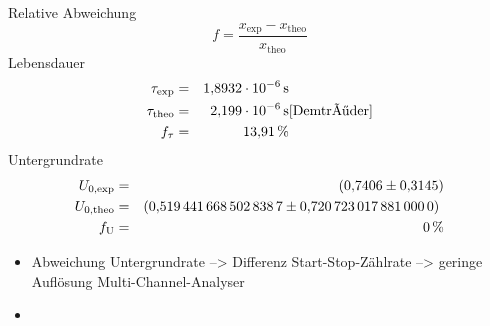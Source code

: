 Relative Abweichung
\begin{equation*}
  f=\frac{x_{\text{exp}}-x_{\text{theo}}}{x_{\text{theo}}}
\end{equation*}
Lebensdauer
\begin{align*}
  \tau_{\text{exp}}   &=&   \SI{1.8932e-06}{s}  &\\
  \tau_{\text{theo}}  &=&   \SI{2.199e-06}{s}   &\text{\cite{Demtröder}}\\
  f_{\tau}            &=&   \SI{13.91}{\%}      &\\
\end{align*}
Untergrundrate
\begin{align*}
  U_{\text{0,exp}}    &=&  \SI{0.7406 \pm 0.3145}{} &\\
  U_{\text{0,theo}}   &=&  \SI{0.5194416685028387 \pm 0.720723017881}{}   &\\
  f_{\text{U}}        &=&  \SI{0}{\%} &\\
\end{align*}
\begin{itemize}
  \item Abweichung Untergrundrate --> Differenz Start-Stop-Zählrate --> geringe Auflösung Multi-Channel-Analyser
  \item
\end{itemize}
